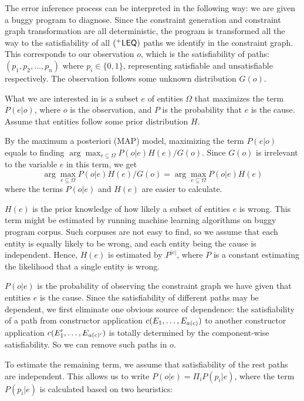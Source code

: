 The error inference process can be interpreted in the following way:
we are given a buggy program to diagnose. Since the constraint
generation and constraint graph transformation are all deterministic,
the program is transformed all the way to the satisfiability of all
$(^{+}\mathsf{LEQ})$ paths we identify in the constraint graph. This
corresponds to our observation $o$, which is the satisfiability of
paths: $(p_1, p_2, \dots, p_n)$ where $p_i\in \{0, 1\}$, representing
satisfiable and unsatisfiable respectively.  The observation follows
some unknown distribution $G(o)$.

What we are interested in is a subset $e$ of entities $\Omega$ that
maximizes the term $P(e|o)$, where $o$ is the observation, and $P$ is
the probability that $e$ is the cause. Assume that entities follow some
prior distribution $H$.

By the maximum a posteriori (MAP) model, maximizing the term $P(e|o)$
equals to finding $\arg\max_{e \subseteq \Omega} P(o|e) H(e) / G(o)$.
Since $G(o)$ is irrelevant to the variable $e$ in this term, we get
\[\arg\max_{e \subseteq \Omega} P(o|e) H(e) / G(o) =  \arg\max_{e
\subseteq \Omega} P(o|e) H(e)\]
\noindent
where the terms $P(o|e)$ and $H(e)$
are easier to calculate.

$H(e)$ is the prior knowledge of how likely a subset of entities $e$ is
wrong. This term might be estimated by running machine learning algorithms on
buggy program corpus. Such corpuses are not easy to find, so
we assume that each entity is equally likely to be wrong, and each
entity being the cause is independent. Hence, $H(e)$ is estimated by
$P^{|e|}$, where $P$ is a constant estimating the likelihood that a
single entity is wrong.

$P(o|e)$ is the probability of observing the constraint graph we have
given that entities $e$ is the cause.
%
Since the satisfiability of different paths may be dependent, we first
eliminate one obvious source of dependence: the satisfiability of a
path from constructor application $c(E_1, \dots, E_{a(c)})$ to
another constructor application $c(E_1', \dots, E_{a(c)'})$ is
totally determined by the component-wise satisfiability. So we can
remove such paths in $o$.

To estimate the remaining term, we assume that satisfiability of the
rest paths are independent. This allows us to write $P(o|e) = \Pi_i
P(p_i|e)$, where the term $P(p_i|e)$ is calculated based on two
heuristics:

